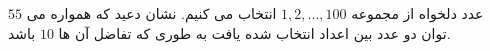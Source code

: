 \exercise
$55$
عدد دلخواه از مجموعه
${1, 2, ..., 100}$
انتخاب می کنیم. نشان دعید که همواره می توان دو عدد بین اعداد انتخاب شده یافت به طوری که تفاضل آن ها
$10$
باشد.